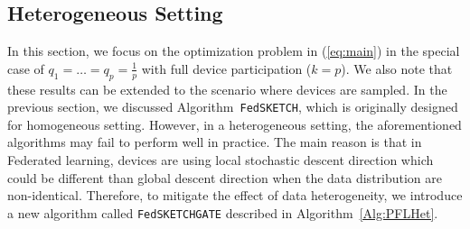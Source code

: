 \documentclass[twoside]{article}
\begin{document}
\vspace{-0.05in}
\subsection{Heterogeneous Setting}
\vspace{-0.05in}



In this section, we focus on the optimization problem in (\ref{eq:main}) in the special case of $q_1=\ldots=q_p=\frac{1}{p}$ with full device participation ($k=p$). 
We also note that these results can be extended to the scenario where devices are sampled.
In the previous section, we discussed Algorithm~\texttt{FedSKETCH}, which is originally designed for homogeneous setting.
However, in a heterogeneous setting, the aforementioned algorithms may fail to perform well in practice. 
The main reason is that in Federated learning, devices are using local stochastic descent direction which could be different than global descent direction when the data distribution are non-identical. 
Therefore, to mitigate the effect of data heterogeneity, we introduce a new algorithm called \texttt{FedSKETCHGATE} described in Algorithm~\ref{Alg:PFLHet}. 
\end{document}
